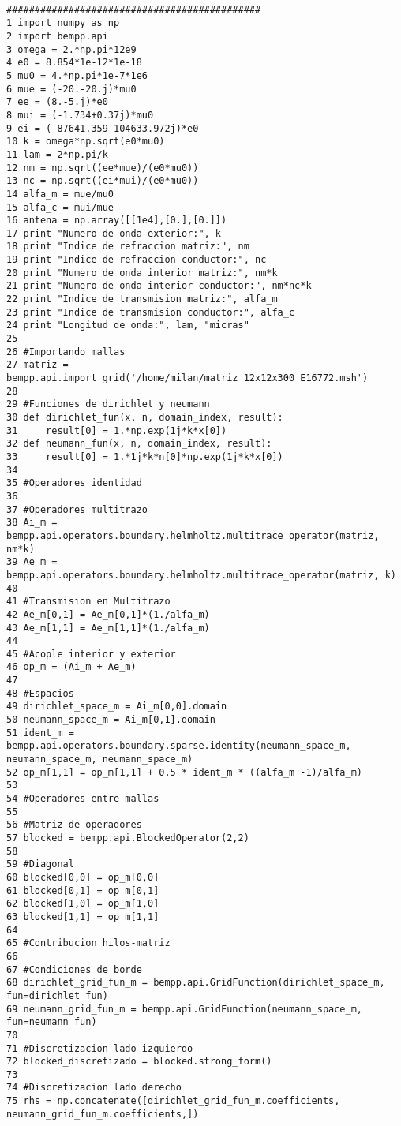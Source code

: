 \documentclass[12pt,letterpaper]{article}
\numberwithin{equation}{section}
\begin{document}
\begin{lstlisting}

#############################################
1 import numpy as np
2 import bempp.api
3 omega = 2.*np.pi*12e9
4 e0 = 8.854*1e-12*1e-18
5 mu0 = 4.*np.pi*1e-7*1e6
6 mue = (-20.-20.j)*mu0
7 ee = (8.-5.j)*e0
8 mui = (-1.734+0.37j)*mu0
9 ei = (-87641.359-104633.972j)*e0
10 k = omega*np.sqrt(e0*mu0)
11 lam = 2*np.pi/k
12 nm = np.sqrt((ee*mue)/(e0*mu0))
13 nc = np.sqrt((ei*mui)/(e0*mu0))
14 alfa_m = mue/mu0
15 alfa_c = mui/mue
16 antena = np.array([[1e4],[0.],[0.]])
17 print "Numero de onda exterior:", k
18 print "Indice de refraccion matriz:", nm
19 print "Indice de refraccion conductor:", nc
20 print "Numero de onda interior matriz:", nm*k
21 print "Numero de onda interior conductor:", nm*nc*k
22 print "Indice de transmision matriz:", alfa_m
23 print "Indice de transmision conductor:", alfa_c
24 print "Longitud de onda:", lam, "micras"
25 
26 #Importando mallas
27 matriz = bempp.api.import_grid('/home/milan/matriz_12x12x300_E16772.msh')
28 
29 #Funciones de dirichlet y neumann
30 def dirichlet_fun(x, n, domain_index, result):
31     result[0] = 1.*np.exp(1j*k*x[0])
32 def neumann_fun(x, n, domain_index, result):
33     result[0] = 1.*1j*k*n[0]*np.exp(1j*k*x[0])
34 
35 #Operadores identidad
36 
37 #Operadores multitrazo
38 Ai_m = bempp.api.operators.boundary.helmholtz.multitrace_operator(matriz, nm*k)
39 Ae_m = bempp.api.operators.boundary.helmholtz.multitrace_operator(matriz, k)
40 
41 #Transmision en Multitrazo
42 Ae_m[0,1] = Ae_m[0,1]*(1./alfa_m)
43 Ae_m[1,1] = Ae_m[1,1]*(1./alfa_m)
44 
45 #Acople interior y exterior
46 op_m = (Ai_m + Ae_m)
47 
48 #Espacios
49 dirichlet_space_m = Ai_m[0,0].domain
50 neumann_space_m = Ai_m[0,1].domain
51 ident_m = bempp.api.operators.boundary.sparse.identity(neumann_space_m, neumann_space_m, neumann_space_m)
52 op_m[1,1] = op_m[1,1] + 0.5 * ident_m * ((alfa_m -1)/alfa_m)
53 
54 #Operadores entre mallas
55 
56 #Matriz de operadores
57 blocked = bempp.api.BlockedOperator(2,2)
58 
59 #Diagonal
60 blocked[0,0] = op_m[0,0]
61 blocked[0,1] = op_m[0,1]
62 blocked[1,0] = op_m[1,0]
63 blocked[1,1] = op_m[1,1]
64 
65 #Contribucion hilos-matriz
66 
67 #Condiciones de borde
68 dirichlet_grid_fun_m = bempp.api.GridFunction(dirichlet_space_m, fun=dirichlet_fun)
69 neumann_grid_fun_m = bempp.api.GridFunction(neumann_space_m, fun=neumann_fun)
70 
71 #Discretizacion lado izquierdo
72 blocked_discretizado = blocked.strong_form()
73 
74 #Discretizacion lado derecho
75 rhs = np.concatenate([dirichlet_grid_fun_m.coefficients, neumann_grid_fun_m.coefficients,])

\end{lstlisting}
\end{document}
